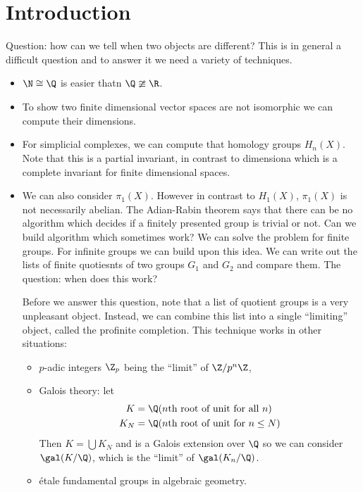 \documentclass[a4paper]{article}
\begin{document}


\tableofcontents

\setcounter{section}{-1}

\section{Introduction}

Question: how can we tell when two objects are different? This is in general a difficult question and to answer it we need a variety of techniques.

\begin{itemize}
\item \(\N \cong \Q\) is easier thatn \(\Q \ncong \R\).
\item To show two finite dimensional vector spaces are not isomorphic we can compute their dimensions.
\item For simplicial complexes, we can compute that homology groups \(H_n(X)\). Note that this is a partial invariant, in contrast to dimensiona which is a complete invariant for finite dimensional spaces.
\item We can also consider \(\pi_1(X)\). However in contrast to \(H_1(X)\), \(\pi_1(X)\) is not necessarily abelian. The Adian-Rabin theorem says that there can be no algorithm which decides if a finitely presented group is trivial or not. Can we build algorithm which sometimes work? We can solve the problem for finite groups. For infinite groups we can build upon this idea. We can write out the lists of finite quotiesnts of two groups \(G_1\) and \(G_2\) and compare them. The question: when does this work?

  Before we answer this question, note that a list of quotient groups is a very unpleasant object. Instead, we can combine this list into a single ``limiting'' object, called the profinite completion. This technique works in other situations:
  \begin{itemize}
  \item \(p\)-adic integers \(\Z_p\) being the ``limit'' of \(\Z/p^n\Z\),
  \item Galois theory: let
    \begin{align*}
      K &= \Q(n\text{th root of unit for all } n) \\
      K_N &= \Q(n\text{th root of unit for } n \leq N)
    \end{align*}
    Then \(K = \bigcup K_N\) and is a Galois extension over \(\Q\) so we can consider \(\gal(K/\Q)\), which is the ``limit'' of \(\gal(K_n/\Q)\).
  \item étale fundamental groups in algebraic geometry.
  \end{itemize}
\end{itemize}
\end{document}
